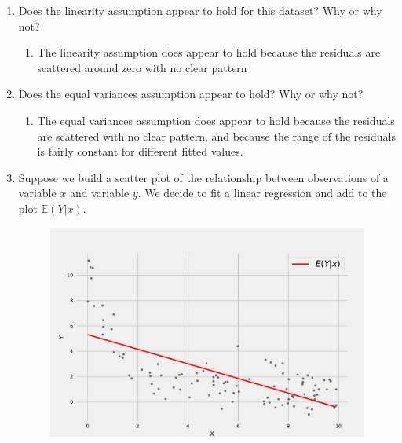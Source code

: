 \documentclass[krantz1,ChapterTOCs]{krantz}
\begin{document}
\begin{enumerate}
\begin{enumerate}
    
        \item Does the linearity assumption appear to hold for this dataset? Why or why not?
            \begin{enumerate}
            \item {\color{red}
            
            The linearity assumption does appear to hold because the residuals are scattered around zero with no clear pattern
            }
        \end{enumerate}


        \item Does the equal variances assumption appear to hold? Why or why not?
        \begin{enumerate}
            \item {\color{red}
            
            The equal variances assumption does appear to hold because the residuals are scattered with no clear pattern, and because the range of the residuals is fairly constant for different fitted values.
            }
        \end{enumerate}

    
    \item Suppose we build a scatter plot of the relationship between observations of a variable $x$ and variable $y$. 
    We decide to fit a linear regression and add to the plot $\mathbb{E}(Y|x)$. 
    
    \begin{figure}[ht!]
        \centering
        \includegraphics{chapters/chapter7/nonlinear_relationship.pdf}
    \end{figure}
    

\end{enumerate}
\end{enumerate}
\end{document}
